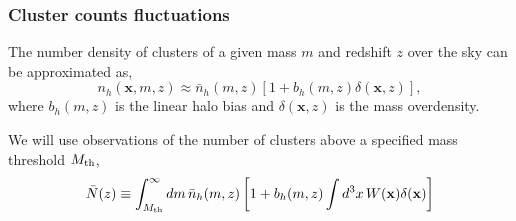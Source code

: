\documentclass[preprint]{aastex}
\newcommand{\xv}{\mathbf{x}}
\newcommand{\nbar}{\bar{n}}
\newcommand{\mth}{M_{\rm th}}
\begin{document}
\subsubsection{Cluster counts fluctuations}
The number density of clusters of a given mass $m$ and redshift $z$ over the 
sky can be approximated as,
\begin{equation}
	n_{h}(\xv, m, z) \approx \nbar_{h}(m, z)
	\left[1 + b_{h}(m,z) \delta(\xv, z)\right],
\end{equation}
where $b_{h}(m,z)$ is the linear halo bias and
$\delta(\xv,z)$ is the mass overdensity.

We will use observations of the number of clusters above a 
specified mass threshold $\mth$,
\begin{equation}
	\bar{N}(z) \equiv
	\int_{\mth}^{\infty} dm\, 
	\nbar_{h}(m,z)
	\left[
	1 + b_{h}(m,z)
	\int d^{3}x\, W(\xv) \delta(\xv)
	\right]
\end{equation}





\end{document}
